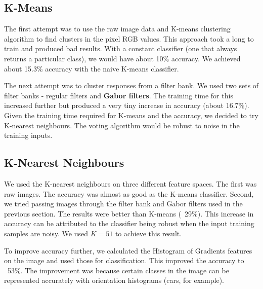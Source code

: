 \documentclass{article} %
\begin{document}
\subsection{K-Means} %
The first attempt was to use the raw image data and K-means clustering algorithm to find clusters in the pixel RGB values. This approach took a long to train and produced bad results. With a constant classifier (one that always returns a particular class), we would have about 10\% accuracy. We achieved about 15.3\% accuracy with the naive K-means classifier. %

        The next attempt was to cluster responses from a filter bank. We used two sets of filter banks - regular filters and \textbf{Gabor filters}. The training time for this increased further but produced a very tiny increase in accuracy (about 16.7\%). Given the training time required for K-means and the accuracy, we decided to try K-nearest neighbours. The voting algorithm would be robust to noise in the training inputs.

\subsection{K-Nearest Neighbours} %
We used the K-nearest neighbours on three different feature spaces. The first was raw images. The accuracy was almost as good as the K-means classifier. Second, we tried passing images through the filter bank and Gabor filters used in the previous section. The results were better than K-means (~29\%). This increase in accuracy can be attributed to the classifier being robust when the input training samples are noisy. We used $K=51$ to achieve this result.

        To improve accuracy further, we calculated the Histogram of Gradients features on the image and used those for classification. This improved the accuracy to ~53\%. The improvement was because certain classes in the image can be represented accurately with orientation histograms (cars, for example).
\end{document}
